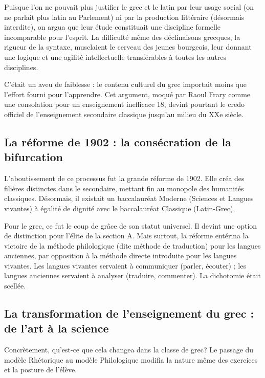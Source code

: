 Puisque l'on ne pouvait plus justifier le grec et le latin par leur usage social (on ne parlait plus
latin au Parlement) ni par la production littéraire (désormais interdite), on argua que leur étude
constituait une discipline formelle incomparable pour l'esprit. La difficulté même des déclinaisons
grecques, la rigueur de la syntaxe, \og musclaient\fg{} le cerveau des jeunes bourgeois, leur
donnant une logique et une agilité intellectuelle transférables à toutes les autres
disciplines.\cite{I-1-1-ref23}

C'était un aveu de faiblesse : le contenu culturel du grec importait moins que l'effort fourni pour
l'apprendre. Cet argument, moqué par Raoul Frary comme une \og consolation\fg{} pour un enseignement
inefficace 18, devint pourtant le credo officiel de l'enseignement secondaire classique jusqu'au
milieu du XXe siècle.



\subsection{La réforme de 1902 : la consécration de la bifurcation}

L'aboutissement de ce processus fut la grande réforme de 1902. Elle créa des filières distinctes
dans le secondaire, mettant fin au monopole des humanités classiques. Désormais, il existait un
baccalauréat \og Moderne\fg{} (Sciences et Langues vivantes) à égalité de dignité avec le
baccalauréat \og Classique\fg{} (Latin-Grec).\cite{I-1-1-ref37}

Pour le grec, ce fut le coup de grâce de son statut universel. Il devint une option de distinction
pour l'élite de la section A. Mais surtout, la réforme entérina la victoire de la méthode
philologique (dite \og méthode de traduction\fg{}) pour les langues anciennes, par opposition à la
\og méthode directe\fg{} introduite pour les langues vivantes.\cite{I-1-1-ref38} Les langues
vivantes servaient à communiquer (parler, écouter) ; les langues anciennes servaient à analyser
(traduire, commenter). La dichotomie était scellée.



\subsection{La transformation de l'enseignement du grec : de l'art à la science}

Concrètement, qu'est-ce que cela changea dans la classe de grec? Le passage du modèle Rhétorique au
modèle Philologique modifia la nature même des exercices et la posture de l'élève.



